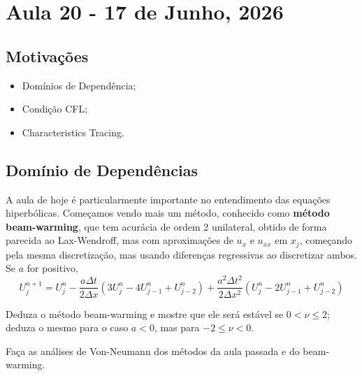 \documentclass[../differential_methods.tex]{subfiles}
\begin{document}
\section{Aula 20 - 17 de Junho, 2026}
\subsection{Motivações}
\begin{itemize}
	\item Domínios de Dependência;
	\item Condição CFL;
	\item Characteristics Tracing.
\end{itemize}
\subsection{Domínio de Dependências}
A aula de hoje é particularmente importante no entendimento das equações hiperbólicas.
Começamos vendo mais um método, conhecido como \hypertarget{beam_warming}{\textbf{método beam-warming}}, que tem acurácia de ordem 2 unilateral, obtido de forma parecida ao Lax-Wendroff, mas com aproximações de \(u_x\) e \(u_{xx}\) em \(x_{j}\), começando pela mesma discretização, mas usando diferenças regressivas ao discretizar ambos. Se \(a\) for positivo,
\[
	\boxed{U_{j}^{n+1} = U_{j}^{n} - \frac{a\Delta t}{2\Delta x} (3U_{j}^{n} - 4U_{j-1}^{n} + U_{j-2}^{n}) + \frac{a^{2}\Delta t^{2}}{2\Delta x^{2}}(U_{j}^{n}-2U_{j-1}^{n} + U_{j-2}^{n})}
\]
\begin{exr}
	Deduza o método beam-warming e mostre que ele será estável se \(0 < \nu \leq 2\); deduza o mesmo para o caso \(a < 0\), mas para \(-2 \leq \nu < 0 \).
\end{exr}
\begin{exr}
	Faça as análises de Von-Neumann dos métodos da aula passada e do beam-warming.
\end{exr}
\end{document}

